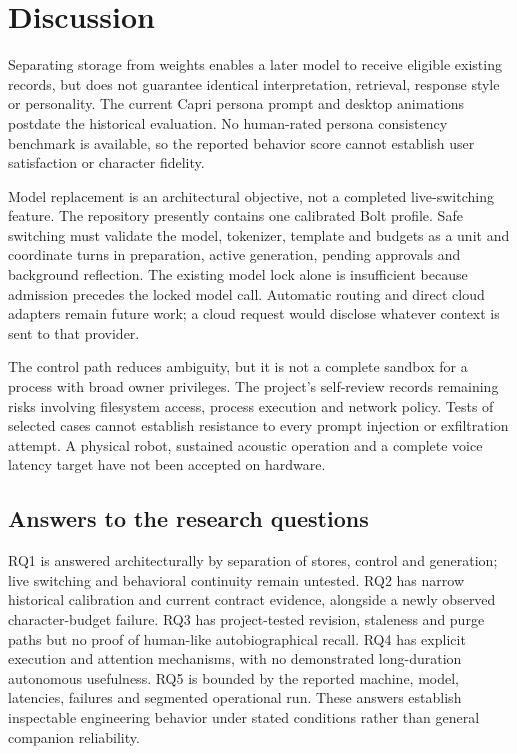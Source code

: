 \documentclass[11pt]{article}
\begin{document}
\section{Discussion}
Separating storage from weights enables a later model to receive eligible existing records, but does not guarantee identical interpretation, retrieval, response style or personality. The current Capri persona prompt and desktop animations postdate the historical evaluation. No human-rated persona consistency benchmark is available, so the reported behavior score cannot establish user satisfaction or character fidelity.

Model replacement is an architectural objective, not a completed live-switching feature. The repository presently contains one calibrated Bolt profile. Safe switching must validate the model, tokenizer, template and budgets as a unit and coordinate turns in preparation, active generation, pending approvals and background reflection. The existing model lock alone is insufficient because admission precedes the locked model call. Automatic routing and direct cloud adapters remain future work; a cloud request would disclose whatever context is sent to that provider.

The control path reduces ambiguity, but it is not a complete sandbox for a process with broad owner privileges. The project's self-review records remaining risks involving filesystem access, process execution and network policy. Tests of selected cases cannot establish resistance to every prompt injection or exfiltration attempt. A physical robot, sustained acoustic operation and a complete voice latency target have not been accepted on hardware.


\subsection{Answers to the research questions}
RQ1 is answered architecturally by separation of stores, control and generation; live switching and behavioral continuity remain untested. RQ2 has narrow historical calibration and current contract evidence, alongside a newly observed character-budget failure. RQ3 has project-tested revision, staleness and purge paths but no proof of human-like autobiographical recall. RQ4 has explicit execution and attention mechanisms, with no demonstrated long-duration autonomous usefulness. RQ5 is bounded by the reported machine, model, latencies, failures and segmented operational run. These answers establish inspectable engineering behavior under stated conditions rather than general companion reliability.
\end{document}
